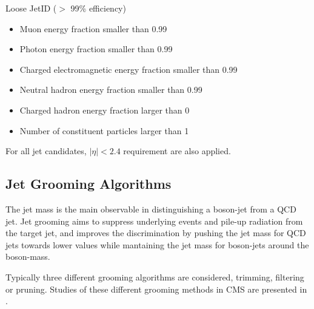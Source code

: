 Loose JetID ($>$ 99\% efficiency)
\begin{itemize}
\item Muon energy fraction smaller than 0.99
\item Photon energy fraction smaller than 0.99
\item Charged electromagnetic energy fraction smaller than 0.99
\item Neutral hadron energy fraction smaller than 0.99
\item Charged hadron energy fraction larger than 0
\item Number of constituent particles larger than 1
\end{itemize}

For all jet candidates, $|\eta| < 2.4$ requirement are also applied.

\subsection{Jet Grooming Algorithms}

The jet mass is the main observable in distinguishing a boson-jet from a QCD jet. Jet grooming aims to suppress underlying events and pile-up radiation from the target jet, and improves the discrimination by pushing the jet mass for QCD jets towards lower values while mantaining the jet mass for boson-jets around the boson-mass\cite{AN-12-137,AN-13-072}.

Typically three different grooming algorithms are considered, trimming\cite{JetTrim}, filtering\cite{JetFilter} or pruning\cite{JetPruned,JetPruned2}. Studies of these different grooming methods in CMS are presented in \cite{GroomCMS}.

